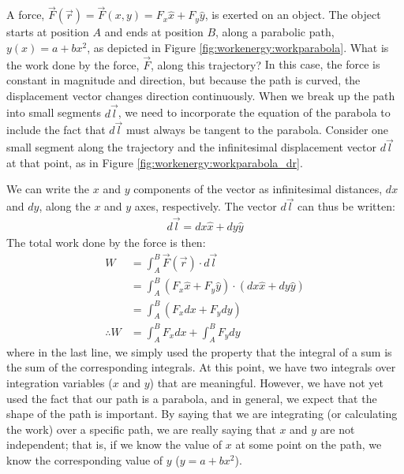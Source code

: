 \begin{example}{
A force, $\vec F(\vec r) = \vec F(x,y) = F_x\hat x + F_y \hat y$, is exerted on an object. The object starts at position $A$ and ends at position $B$, along a parabolic path, $y(x) = a+bx^2$, as depicted in Figure \ref{fig:workenergy:workparabola}. What is the work done by the force, $\vec F$, along this trajectory?}
In this case, the force is constant in magnitude and direction, but because the path is curved, the displacement vector changes direction continuously. When we break up the path into small segments $d\vec l$, we need to incorporate the equation of the parabola to include the fact that $d\vec l$ must always be tangent to the parabola. Consider one small segment along the trajectory and the infinitesimal displacement vector $d\vec l$ at that point, as in Figure \ref{fig:workenergy:workparabola_dr}.

We can write the $x$ and $y$ components of the vector as infinitesimal distances, $dx$ and $dy$, along the $x$ and $y$ axes, respectively. The vector $d\vec l$ can thus be written:
\begin{align*}
d\vec l = dx \hat x + dy \hat y
\end{align*}
The total work done by the force is then:
\begin{align*}
W &= \int_A^B \vec F(\vec r) \cdot d\vec l\\
&=\int_A^B (F_x\hat x + F_y \hat y) \cdot (dx \hat x + dy \hat y)\\
&=\int_A^B (F_x dx + F_ydy)\\
\therefore W&= \int_A^B F_x dx + \int_A^B F_ydy
\end{align*}
where in the last line, we simply used the property that the integral of a sum is the sum of the corresponding integrals. At this point, we have two integrals over integration variables ($x$ and $y$) that are meaningful. However, we have not yet used the fact that our path is a parabola, and in general, we expect that the shape of the path is important. By saying that we are integrating (or calculating the work) over a specific path, we are really saying that $x$ and $y$ are not independent; that is, if we know the value of $x$ at some point on the path, we know the corresponding value of $y$ ($y = a+bx^2$). 


\end{example}
